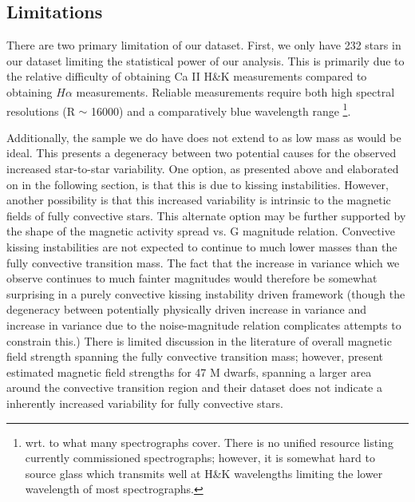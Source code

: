 \subsection{Limitations}
There are two primary limitation of our dataset. First, we only have
{\color{red}232 stars} in our dataset limiting the statistical power of our
analysis. This is primarily due to the relative difficulty of obtaining Ca II
H\&K measurements compared to obtaining $H\alpha$ measurements. Reliable
measurements require both high spectral resolutions (R $\sim$ 16000) and a
comparatively blue wavelength range \footnote{wrt. to what many spectrographs
cover. There is no unified resource listing currently commissioned
spectrographs; however, it is somewhat hard to source glass which transmits
well at H\&K wavelengths limiting the lower wavelength of most spectrographs.}.

Additionally, the sample we do have does not extend to as low mass as would be
ideal. This presents a degeneracy between two potential causes for the observed
increased star-to-star variability. One option, as presented above and
elaborated on in the following section, is that this is due to kissing
instabilities. However, another possibility is that this increased variability
is intrinsic to the magnetic fields of fully convective stars. This alternate
option may be further supported by the shape of the magnetic activity spread vs.
G magnitude relation. Convective kissing instabilities are not expected to
continue to much lower masses than the fully convective transition mass. The
fact that the increase in variance which we observe continues to much fainter
magnitudes would therefore be somewhat surprising in a purely convective kissing
instability driven framework (though the degeneracy between potentially
physically driven increase in variance and increase in variance due to the
noise-magnitude relation complicates attempts to constrain this.) There is
limited discussion in the literature of overall magnetic field strength
spanning the fully convective transition mass; however, \citet{Shulyak2019}
present estimated magnetic field strengths for 47 M dwarfs, spanning a larger
area around the convective transition region and their dataset does not
indicate a inherently increased variability for fully convective stars.
